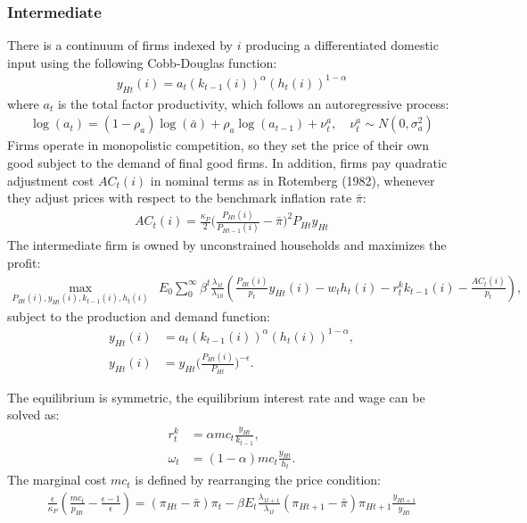 \documentclass[12pt]{article}
\begin{document}
\subsubsection*{Intermediate}
There is a continuum of firms indexed by $i$ producing a differentiated domestic input using the following Cobb-Douglas function:
\begin{align*}
y_{Ht}(i) = a_t(k_{t-1}(i))^{\alpha}(h_t(i))^{1-\alpha}
\end{align*}
where $a_t$ is the total factor productivity, which follows an autoregressive process: 
\begin{align*}
\log(a_t) = (1-\rho_a)\log(\bar{a})+\rho_a\log(a_{t-1})+\nu_t^a, \quad  \nu_t^a \sim N(0,\sigma_a^2)
\end{align*}
Firms operate in monopolistic competition, so they set the price of their own good subject to the demand of final good firms. In addition, firms pay quadratic adjustment cost $AC_t(i)$ in nominal terms as in Rotemberg (1982), whenever they adjust prices with respect to the benchmark inflation rate $\bar{\pi}$:
\begin{align*}
AC_t(i) = \frac{\kappa_P}{2}\Big(\frac{P_{Ht}(i)}{P_{Ht-1}(i)}-\bar{\pi}\Big)^2P_{Ht}y_{Ht}
\end{align*}
The intermediate firm is owned by unconstrained households and maximizes the profit: 
\begin{align*}
\max_{P_{Ht}(i),y_{Ht}(i),k_{t-1}(i), h_t(i)} &E_0 \sum_0^{\infty}\beta^t\frac{\lambda_{1t}}{\lambda_{10}}(\frac{P_{Ht}(i)}{p_t}y_{Ht}(i)-w_th_t(i)-r_t^kk_{t-1}(i)-\frac{AC_t(i)}{p_t}),
\end{align*}
subject to the production and demand function: 
\begin{align*}
y_{Ht}(i) &= a_t(k_{t-1}(i))^{\alpha}(h_t(i))^{1-\alpha}, \\
y_{Ht}(i) &= y_{Ht}\Big(\frac{P_{Ht}(i)}{P_{Ht}}\Big)^{-\epsilon}.
\end{align*}

The equilibrium is symmetric, the equilibrium interest rate and wage can be solved as: 
\begin{align*}
r_t^k &= \alpha mc_t \frac{y_{Ht}}{k_{t-1}}, \\
\omega_t &= (1-\alpha) mc_t \frac{y_{Ht}}{h_t}.
\end{align*}
The marginal cost $mc_t$ is defined by rearranging the price condition: 
\begin{align*}
\frac{\epsilon}{\kappa_P}(\frac{mc_t}{p_{Ht}}-\frac{\epsilon-1}{\epsilon}) = (\pi_{Ht}-\bar{\pi})\pi_t-\beta E_t \frac{\lambda_{1t+1}}{\lambda_{1t}} (\pi_{Ht+1}-\bar{\pi})\pi_{Ht+1}\frac{y_{Ht+1}}{y_{Ht}}
\end{align*}
\end{document}
